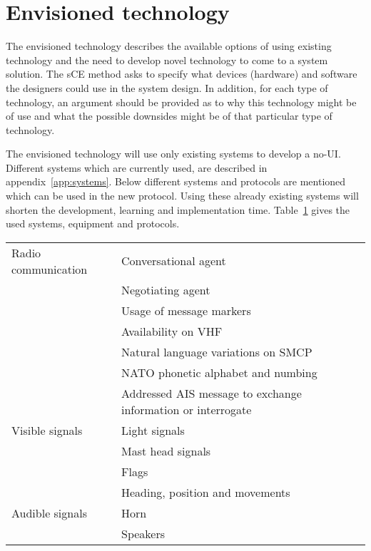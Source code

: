 \section{Envisioned technology}
The envisioned technology describes the available options of using existing technology and the need to develop novel technology to come to a system solution. The sCE method asks to specify what devices (hardware) and software the designers could use in the system design. In addition, for each type of technology, an argument should be provided as to why this technology might be of use and what the possible downsides might be of that particular type of technology.

The envisioned technology will use only existing systems to develop a \ac{no-UI}. Different systems which are currently used, are described in appendix~\ref{app:systems}. Below different systems and protocols are mentioned which can be used in the new protocol. Using these already existing systems will shorten the development, learning and implementation time. Table~\ref{tab:envisioned-technology} gives the used systems, equipment and protocols.

\begin{table}[hbtp]
	\centering
	\begin{tabular}{l|l}
		\toprule
		Radio communication & Conversational agent \\
		& Negotiating agent \\
		& Usage of message markers \\
		& Availability on \ac{VHF} \\
		& Natural language variations on \ac{SMCP} \\
		& NATO phonetic alphabet and numbing \\
		& Addressed \ac{AIS} message to exchange information or interrogate \\
		\midrule
		Visible signals & Light signals \\
		& Mast head signals \\
		& Flags \\
		& Heading, position and movements \\
		\midrule
		Audible signals & Horn \\
		& Speakers\\
		\bottomrule
	\end{tabular}
	
	\label{tab:envisioned-technology}
\end{table}

